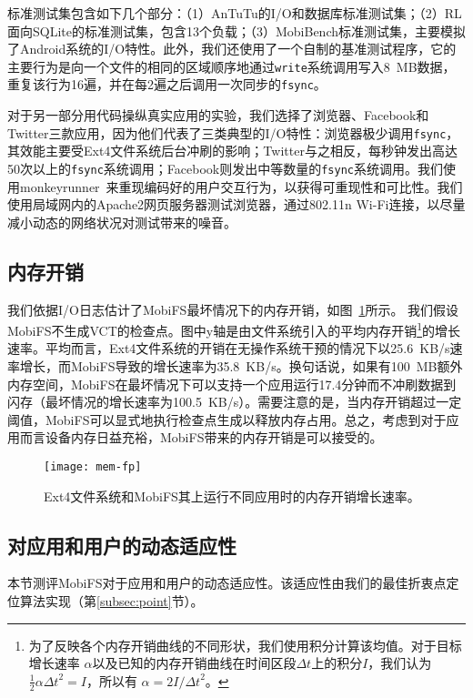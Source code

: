 标准测试集包含如下几个部分：（1）AnTuTu的I/O和数据库标准测试集；（2）RL面向SQLite的标准测试集，包含13个负载；（3）MobiBench标准测试集，主要模拟了Android系统的I/O特性。此外，我们还使用了一个自制的基准测试程序，它的主要行为是向一个文件的相同的区域顺序地通过\texttt{write}系统调用写入8~MB数据，重复该行为16遍，并在每2遍之后调用一次同步的\texttt{fsync}。

对于另一部分用代码操纵真实应用的实验，我们选择了浏览器、Facebook和Twitter三款应用，因为他们代表了三类典型的I/O特性：浏览器极少调用\texttt{fsync}，其效能主要受Ext4文件系统后台冲刷的影响；Twitter与之相反，每秒钟发出高达50次以上的\texttt{fsync}系统调用；Facebook则发出中等数量的\texttt{fsync}系统调用。我们使用monkeyrunner~\cite{Monkeyrunner}来重现编码好的用户交互行为，以获得可重现性和可比性。我们使用局域网内的Apache2网页服务器测试浏览器，通过802.11n Wi-Fi连接，以尽量减小动态的网络状况对测试带来的噪音。

\subsection{内存开销} \label{subsec:mem-fp}

我们依据I/O日志估计了MobiFS最坏情况下的内存开销，如图~\ref{fig:mem-fp}所示。
我们假设MobiFS不生成VCT的检查点。图中y轴是由文件系统引入的平均内存开销\footnote{为了反映各个内存开销曲线的不同形状，我们使用积分计算该均值。对于目标增长速率
$\alpha$以及已知的内存开销曲线在时间区段${\Delta t}$上的积分$I$，我们认为$\frac{1}{2}\alpha{\Delta t}^2 = I$，所以有
$\alpha=2I/{\Delta t}^2$。}的增长速率。平均而言，Ext4文件系统的开销在无操作系统干预的情况下以25.6~KB/s速率增长，而MobiFS导致的增长速率为35.8~KB/s。换句话说，如果有100~MB额外内存空间，MobiFS在最坏情况下可以支持一个应用运行17.4分钟而不冲刷数据到闪存（最坏情况的增长速率为100.5~KB/s）。需要注意的是，当内存开销超过一定阈值，MobiFS可以显式地执行检查点生成以释放内存占用。总之，考虑到对于应用而言设备内存日益充裕，MobiFS带来的内存开销是可以接受的。

\begin{figure}[!ht]
  \centering
  \texttt{[image: mem-fp]}
  \caption{Ext4文件系统和MobiFS其上运行不同应用时的内存开销增长速率。}
  \label{fig:mem-fp}
\end{figure}

\subsection{对应用和用户的动态适应性} \label{subsec:eval-ada}

本节测评MobiFS对于应用和用户的动态适应性。该适应性由我们的最佳折衷点定位算法实现（第\ref{subsec:point}节）。

